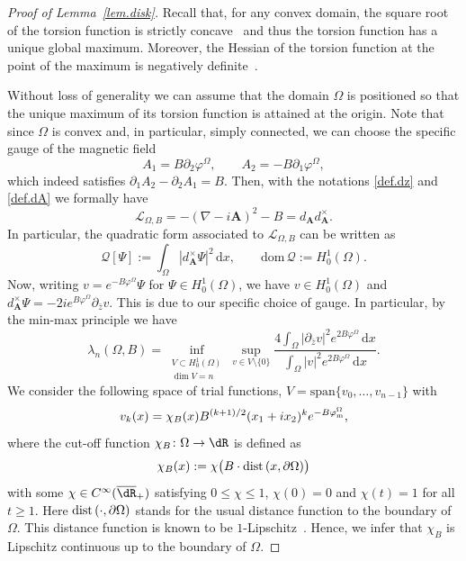 \documentclass[11pt,a4paper]{amsart}
\newcommand\Omg{\Omega}
\def\p{\partial}
\def\arr{\rightarrow}
\def\p{\partial}
\def\dd{{\,\mathrm{d}}}
\numberwithin{figure}{section}
\numberwithin{equation}{section}
\theoremstyle{plain}%
\theoremstyle{remark}
\theoremstyle{plain}
\newcommand\ov{\overline}
\def\ov{\overline}
\newcommand{\dom}{\mathrm{dom}\,}
\begin{document}
\begin{proof}[Proof of Lemma~\ref{lem.disk}]
Recall that, for any convex domain, the square root of the torsion function is strictly concave~\cite[Theorem 1]{KL87} and
thus the torsion function has a unique global maximum.
Moreover, the Hessian of the torsion function at the point of the maximum
is negatively definite~\cite[Theorem 1]{S18}.

Without loss of generality we can assume that the domain $\Omg$ is positioned so that the unique  maximum of its torsion function is attained at the origin.
Note that since $\Omega$ is convex and, in particular, simply connected, we can choose the specific gauge of the magnetic field
\begin{equation}
A_1 = B \partial_2 \varphi^\Omg, \qquad A_2 = - B \partial_1 \varphi^\Omega, 
\end{equation}
which indeed satisfies $\partial_1 A_2 - \partial_2 A_1 = B$. Then, with the notations \eqref{def.dz} and \eqref{def.dA} we formally have
\[ \mathscr{L}_{\Omega, B} = -(\nabla - i\mathbf A)^2 - B = d_{\mathbf A}^{} d^\times_{\mathbf A}.\]
In particular, the quadratic form associated to $\mathscr{L}_{\Omega,B}$ can be written as
\[ \mathscr{Q}[\Psi] := \int_\Omg | d_{\mathbf A}^\times \Psi |^2 \dd x, \qquad \dom\mathscr{Q} :=  H^1_0(\Omg). \]
Now, writing $v = e^{-B \varphi^\Omg} \Psi$ for $\Psi\in H^1_0(\Omg)$, we have $v\in H^1_0(\Omg)$ and $d_{\mathbf A}^\times \Psi = - 2 i e^{B \varphi^\Omg} \partial_{\bar z} v$. This is due to our specific choice of gauge. In particular, by the min-max principle we have
\begin{equation}\label{eq.minmax}
\lambda_n(\Omg,B) = \inf_{\substack{V \subset H^1_0(\Omg) \\ \dim V =n}} \sup_{v \in V\setminus \{0\}} \frac{\displaystyle 4 \int_\Omg | \partial_{\bar z} v |^2 e^{2B \varphi^\Omg} \dd x }{\displaystyle\int_\Omg |v|^2 e^{2B \varphi^\Omg} \dd x}.
\end{equation}
We consider the following space of trial functions, $V= {\mathrm{span}} \{v_0, \dots, v_{n-1}\}$ with
\[ v_k(x) = \chi_B(x) B^{(k+1)/2} (x_1+ix_2)^k e^{- B \varphi^{\Omg}_{\rm m}}, \]
where the cut-off function $\chi_B\colon\Omg\arr\dR$ is defined as
\begin{equation}\label{eq:chiB}
	\chi_B(x) := \chi\big(B\cdot{\rm dist}\,(x,\p\Omg)\big)
\end{equation} 
with some $\chi \in C^\infty(\ov\dR_+)$ satisfying $0\le \chi\le 1$,
$\chi(0) = 0$ and $\chi(t) = 1$ for all $t \ge 1$. Here ${\rm dist}\,(\cdot,\p\Omg)$ stands for the usual distance function to the boundary of $\Omg$. This distance function is known to be $1$-Lipschitz~\cite[Section 3]{DZ94}. Hence, we infer that $\chi_B$ is Lipschitz continuous up to the boundary of $\Omg$.


\end{proof}
\end{document}
